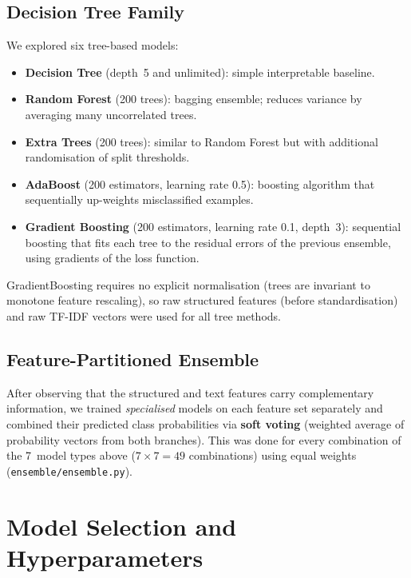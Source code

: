 \documentclass[11pt,letterpaper]{article}
\begin{document}
\subsection{Decision Tree Family}
We explored six tree-based models:
\begin{itemize}
  \item \textbf{Decision Tree} (depth~5 and unlimited): simple interpretable baseline.
  \item \textbf{Random Forest} (200 trees): bagging ensemble; reduces variance by
        averaging many uncorrelated trees.
  \item \textbf{Extra Trees} (200 trees): similar to Random Forest but with
        additional randomisation of split thresholds.
  \item \textbf{AdaBoost} (200 estimators, learning rate 0.5): boosting algorithm
        that sequentially up-weights misclassified examples.
  \item \textbf{Gradient Boosting} (200 estimators, learning rate 0.1, depth~3):
        sequential boosting that fits each tree to the residual errors of the
        previous ensemble, using gradients of the loss function.
\end{itemize}

GradientBoosting requires no explicit normalisation (trees are invariant to
monotone feature rescaling), so raw structured features (before standardisation)
and raw TF-IDF vectors were used for all tree methods.

\subsection{Feature-Partitioned Ensemble}
After observing that the structured and text features carry complementary
information, we trained \emph{specialised} models on each feature set separately
and combined their predicted class probabilities via \textbf{soft voting}
(weighted average of probability vectors from both branches).
This was done for every combination of the 7~model types above ($7\times7 = 49$
combinations) using equal weights (\texttt{ensemble/ensemble.py}).

\section{Model Selection and Hyperparameters}
\end{document}
